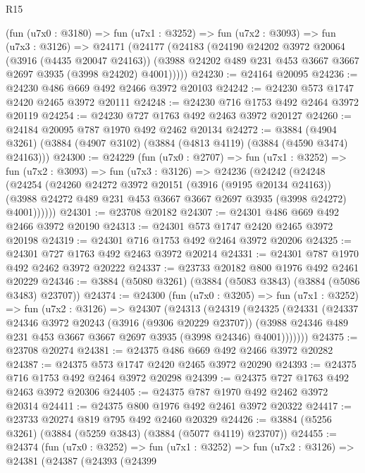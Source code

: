 \begin{lexlean}{R15}
\begin{coremodule}
    (fun (u7x0 : @3180) =>
    fun (u7x1 : @3252) =>
    fun (u7x2 : @3093) =>
    fun (u7x3 : @3126) =>
    @24171
      (@24177
        (@24183
          (@24190
            @24202
            @3972
            @20064
            (@3916 (@4435 @20047 @24163))
            (@3988 @24202 @489 @231 @453 @3667 @3667 @2697 @3935 (@3998 @24202) @4001)))))
@24230 := @24164 @20095
@24236 := @24230 @486 @669 @492 @2466 @3972 @20103
@24242 := @24230 @573 @1747 @2420 @2465 @3972 @20111
@24248 := @24230 @716 @1753 @492 @2464 @3972 @20119
@24254 := @24230 @727 @1763 @492 @2463 @3972 @20127
@24260 := @24184 @20095 @787 @1970 @492 @2462 @20134
@24272 := @3884
    (@4904 @3261)
    (@3884 (@4907 @3102) (@3884 (@4813 @4119) (@3884 (@4590 @3474) @24163)))
@24300 := @24229
    (fun (u7x0 : @2707) =>
    fun (u7x1 : @3252) =>
    fun (u7x2 : @3093) =>
    fun (u7x3 : @3126) =>
    @24236
      (@24242
        (@24248
          (@24254
            (@24260
              @24272
              @3972
              @20151
              (@3916 (@9195 @20134 @24163))
              (@3988 @24272 @489 @231 @453 @3667 @3667 @2697 @3935 (@3998 @24272) @4001))))))
@24301 := @23708 @20182
@24307 := @24301 @486 @669 @492 @2466 @3972 @20190
@24313 := @24301 @573 @1747 @2420 @2465 @3972 @20198
@24319 := @24301 @716 @1753 @492 @2464 @3972 @20206
@24325 := @24301 @727 @1763 @492 @2463 @3972 @20214
@24331 := @24301 @787 @1970 @492 @2462 @3972 @20222
@24337 := @23733 @20182 @800 @1976 @492 @2461 @20229
@24346 := @3884 (@5080 @3261) (@3884 (@5083 @3843) (@3884 (@5086 @3483) @23707))
@24374 := @24300
    (fun (u7x0 : @3205) =>
    fun (u7x1 : @3252) =>
    fun (u7x2 : @3126) =>
    @24307
      (@24313
        (@24319
          (@24325
            (@24331
              (@24337
                @24346
                @3972
                @20243
                (@3916 (@9306 @20229 @23707))
                (@3988 @24346 @489 @231 @453 @3667 @3667 @2697 @3935 (@3998 @24346) @4001)))))))
@24375 := @23708 @20274
@24381 := @24375 @486 @669 @492 @2466 @3972 @20282
@24387 := @24375 @573 @1747 @2420 @2465 @3972 @20290
@24393 := @24375 @716 @1753 @492 @2464 @3972 @20298
@24399 := @24375 @727 @1763 @492 @2463 @3972 @20306
@24405 := @24375 @787 @1970 @492 @2462 @3972 @20314
@24411 := @24375 @800 @1976 @492 @2461 @3972 @20322
@24417 := @23733 @20274 @819 @795 @492 @2460 @20329
@24426 := @3884 (@5256 @3261) (@3884 (@5259 @3843) (@3884 (@5077 @4119) @23707))
@24455 := @24374
    (fun (u7x0 : @3252) =>
    fun (u7x1 : @3252) =>
    fun (u7x2 : @3126) =>
    @24381
      (@24387
        (@24393
          (@24399

\end{coremodule}
\end{lexlean}
